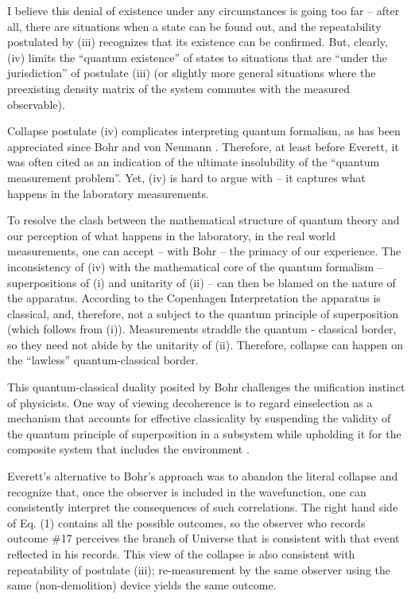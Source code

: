 \documentclass[aps,amsmath,amssymb,amsfonts,floatfix]{revtex4-1}
\newcommand{\+}         {\dagger}
\begin{document}
I believe this denial of existence under any circumstances is going
too far -- after all, there are situations when a state can be found out, and the repeatability postulated by (iii) recognizes that its existence can be confirmed. But, clearly, (iv) limits the ``quantum existence'' of states to situations that are ``under the jurisdiction'' of postulate (iii) (or slightly more general situations where the preexisting density matrix
of the system commutes with the measured observable).

Collapse postulate (iv) complicates interpreting quantum formalism, as has been appreciated since Bohr and von Neumann \cite{11,59}. Therefore, at least before Everett, it was often cited as an indication of the ultimate insolubility of the ``quantum measurement problem''.
Yet, (iv) is hard to argue with -- it captures what happens in the laboratory measurements. 

To resolve the clash between the mathematical structure of quantum theory and our perception of what happens in the laboratory, in the real world measurements, one can accept 
-- with Bohr -- the primacy of our experience. The inconsistency of (iv) with the mathematical core of the quantum formalism -- superpositions of (i) and unitarity of (ii) -- can then be blamed
on the nature of the apparatus. According to the Copenhagen Interpretation the apparatus is classical, and,
therefore, not a subject to the quantum principle of superposition (which
follows from (i)). 
Measurements straddle the quantum - classical border, so they need not abide by the unitarity of (ii). Therefore, collapse can happen on the ``lawless'' quantum-classical border.

This quantum-classical duality posited by Bohr challenges the unification instinct of physicists.
One way of viewing decoherence is to regard einselection as a mechanism that accounts for effective classicality by suspending the validity of the quantum  
principle of superposition in a subsystem while upholding it for the composite system that includes the environment \cite{71,75}.

Everett's alternative to Bohr's approach was to abandon the literal
collapse and recognize that, once the observer is included
in the wavefunction, one can consistently interpret the consequences of such correlations. 
The right hand side of Eq. (1) contains all the possible outcomes, so the observer who records 
outcome \#17 perceives the branch of Universe that is consistent with that event reflected 
in his records. This view of the collapse is also consistent with repeatability of postulate (iii);  
re-measurement by the same observer using the same (non-demolition) device yields the same outcome.
\end{document}
